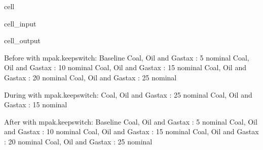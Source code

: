 \documentclass[letterpaper,10pt,english]{jupyterBook}
\begin{document}
\begin{sphinxuseclass}{cell}\begin{sphinxVerbatimInput}

\begin{sphinxuseclass}{cell_input}
\begin{sphinxVerbatim}[commandchars=\\\{\}]
   
\end{sphinxVerbatim}

\end{sphinxuseclass}\end{sphinxVerbatimInput}
\begin{sphinxVerbatimOutput}

\begin{sphinxuseclass}{cell_output}
\begin{sphinxVerbatim}[commandchars=\\\{\}]
Before with mpak.keepswitch:
Baseline
Coal, Oil and Gastax : 5 nominal
Coal, Oil and Gastax : 10 nominal
Coal, Oil and Gastax : 15 nominal
Coal, Oil and Gastax : 20 nominal
Coal, Oil and Gastax : 25 nominal

During with mpak.keepswitch:
Coal, Oil and Gastax : 25 nominal
Coal, Oil and Gastax : 15 nominal

After with mpak.keepswitch:
Baseline
Coal, Oil and Gastax : 5 nominal
Coal, Oil and Gastax : 10 nominal
Coal, Oil and Gastax : 15 nominal
Coal, Oil and Gastax : 20 nominal
Coal, Oil and Gastax : 25 nominal
\end{sphinxVerbatim}

\end{sphinxuseclass}\end{sphinxVerbatimOutput}

\end{sphinxuseclass}
\end{document}
